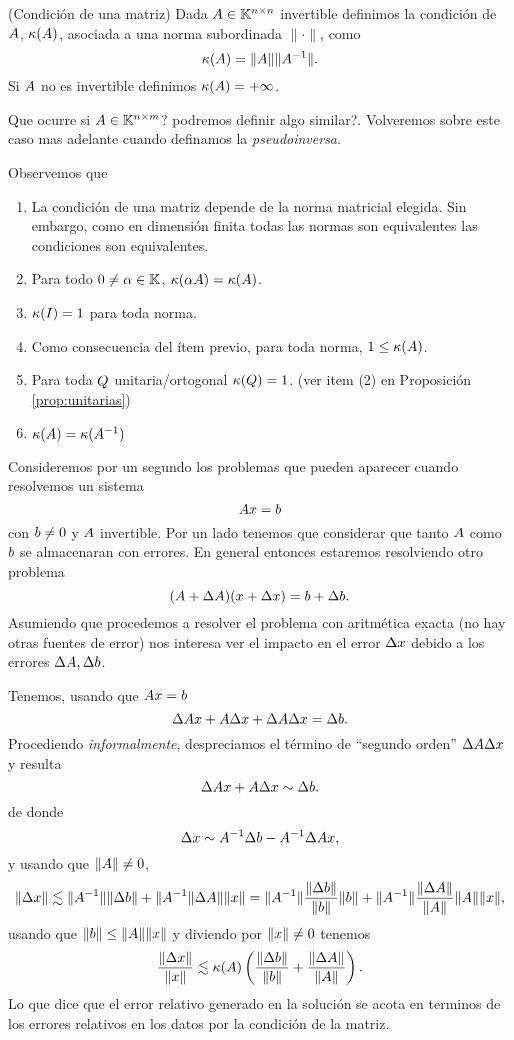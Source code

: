 \begin{definicion}{(Condición de una matriz)}
Dada $\Ab\in \Knn$ invertible definimos la condición de $\Ab$, $\kappa(\Ab)$, asociada a una norma subordinada $\|\cdot\|$, como
$$
\kappa(\Ab)=\|\Ab\|\|\Ab^{-1}\|.
$$
Si $\Ab$ no es invertible definimos $\kappa(\Ab)=+\infty$.

\end{definicion}
Que ocurre si $\Ab\in \K^{n\times m}$? podremos definir algo similar?.  Volveremos sobre este caso mas adelante cuando definamos la \emph{pseudoinversa}.
\begin{observacion}
\label{rem:deCondicion}
Observemos que
\begin{enumerate}
 \item La condición de una matriz depende de la norma matricial elegida. Sin embargo, como en dimensión finita todas las normas son equivalentes las condiciones son equivalentes.
\item Para todo $\cero\neq \alpha\in \K$, $\kappa(\alpha\Ab)=\kappa(\Ab)$.
\item $\kappa(\Ib)=1$ para toda norma.
 \item Como consecuencia del ítem previo, para toda norma, $1\le \kappa(\Ab)$.
\item Para toda $\Qb$ unitaria/ortogonal
$\kappa(\Qb)=1$. (ver item (2) en Proposición \ref{prop:unitarias})
\item $\kappa(\Ab)=\kappa(\Ab^{-1})$
\end{enumerate}
\end{observacion}
Consideremos por un segundo los problemas que pueden aparecer cuando resolvemos un sistema
$$
\Ab\xb=\bb
$$
con $\bb\neq\cero$ y $\Ab$ invertible.
Por un lado tenemos que considerar que tanto $\Ab$ como $\bb$ se almacenaran con errores. En general entonces estaremos resolviendo otro problema
$$
(\Ab+\Delta\Ab)(\xb+\Delta \xb)=
\bb +\Delta \bb.
$$
Asumiendo que procedemos a resolver el problema con aritmética exacta (no hay otras fuentes de error) nos interesa ver el impacto en el error $\Delta \xb$ debido a los errores $\Delta \Ab,\Delta \bb$.

Tenemos, usando que $\Ab\xb=\bb$
$$
\Delta \Ab\xb+\Ab\Delta\xb+\Delta \Ab\Delta \xb=\Delta \bb.
$$
Procediendo \emph{informalmente}, despreciamos el término de ``segundo orden'' $\Delta \Ab\Delta \xb$ y resulta
$$
\Delta \Ab\xb+\Ab\Delta\xb \sim \Delta \bb.
$$
de donde
$$
\Delta \xb\sim \Ab^{-1}\Delta \bb-\Ab^{-1}\Delta \Ab\xb,
$$
y usando que $\|\Ab\|\neq 0$,
$$
\|\Delta \xb\|\lesssim \|\Ab^{-1}\|\|\Delta \bb\|+\|\Ab^{-1}\|\Delta \Ab\|\|\xb\|=\|\Ab^{-1}\|\frac{\|\Delta \bb\|}{\|\bb\|}\|\bb\|+\|\Ab^{-1}\|\frac{\|\Delta \Ab\|}{\|\Ab\|}\|\Ab\|\|\xb\|,
$$
usando que $\|\bb\|\le \|\Ab\|\|\xb\|$ y diviendo por $\|\xb\|\neq \cero$ tenemos
$$\frac{\|\Delta \xb\|}{\|\xb\|}\lesssim \kappa(\Ab)\left(\frac{\|\Delta \bb\|}{\|\bb\|}+ \frac{\|\Delta \Ab\|}{\|\Ab\|}\right).$$
Lo que dice que el error  relativo generado en la solución  se acota en terminos de los errores relativos en los datos por la condición de la matriz.

